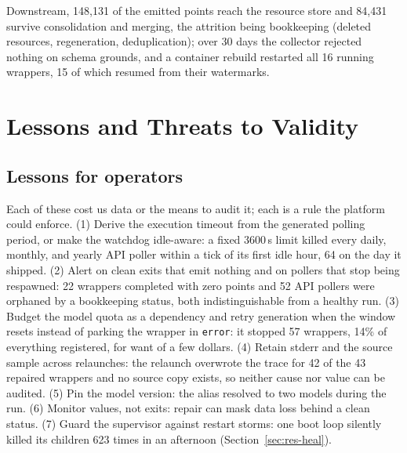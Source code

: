 \documentclass[conference]{IEEEtran}
\begin{document}
Downstream, 148{,}131 of the \nDataPoints{} emitted points reach the resource
store and 84{,}431 survive consolidation and merging, the attrition being
bookkeeping (deleted resources, regeneration, deduplication); over 30 days the
collector rejected nothing on schema grounds, and a container rebuild restarted all
16 running wrappers, 15 of which resumed from their watermarks.

\section{Lessons and Threats to Validity}
\label{sec:discussion}

\subsection{Lessons for operators}
Each of these cost us data or the means to audit it; each is a rule the platform
could enforce. (1) Derive the execution timeout from the generated polling period, or
make the watchdog idle-aware: a fixed 3600\,s limit killed every daily, monthly, and
yearly API poller within a tick of its first idle hour, 64 on the day it shipped.
(2) Alert on clean exits that emit nothing and on pollers that stop being respawned:
22 wrappers completed with zero points and 52 API pollers were orphaned by a
bookkeeping status, both indistinguishable from a healthy run. (3) Budget the model
quota as a dependency and retry generation when the window resets instead of parking
the wrapper in \texttt{error}: it stopped 57 wrappers, 14\% of everything
registered, for want of a few dollars. (4) Retain stderr and the source sample across relaunches: the
relaunch overwrote the trace for 42 of the 43 repaired wrappers and no source copy
exists, so neither cause nor value can be audited. (5) Pin the model version: the
alias resolved to two models during the run. (6) Monitor values, not exits: repair can
mask data loss behind a clean status. (7) Guard the supervisor against restart storms:
one boot loop silently killed its children 623 times in an afternoon
(Section~\ref{sec:res-heal}).
\end{document}
